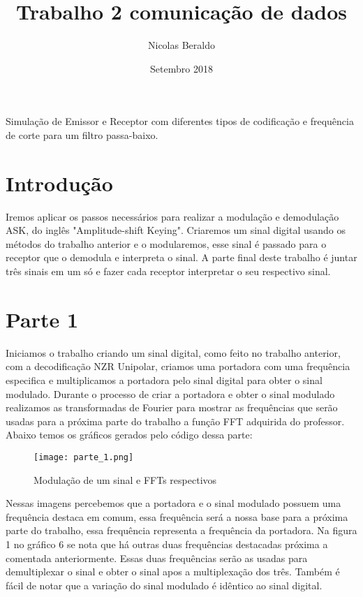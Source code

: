 \documentclass{article}
\title{Trabalho 2 comunicação de dados}
\author{Nicolas Beraldo}
\date{Setembro 2018}
\begin{document}
    \maketitle
        \begin{center}
            Simulação de Emissor e Receptor com diferentes tipos de codificação e frequência de corte para um filtro passa-baixo.
        \end{center}
    \section*{Introdução}
        Iremos aplicar os passos necessários para realizar a modulação e demodulação ASK, do inglês "Amplitude-shift Keying". Criaremos um sinal digital usando os métodos do trabalho anterior e o modularemos, esse sinal é passado para o receptor que o demodula e interpreta o sinal. A parte final deste trabalho é juntar três sinais em um só e fazer cada receptor interpretar o seu respectivo sinal.
    \section{Parte 1}
        Iniciamos o trabalho criando um sinal digital, como feito no trabalho anterior, com a decodificação NZR Unipolar, criamos uma portadora com uma frequência especifica e multiplicamos a portadora pelo sinal digital para obter o sinal modulado. Durante o processo de criar a portadora e obter o sinal modulado realizamos as transformadas de Fourier para mostrar as frequências que serão usadas para a próxima parte do trabalho a função FFT adquirida do professor. Abaixo temos os gráficos gerados pelo código dessa parte: 
        \begin{figure}[H]
            \begin{center}
                \texttt{[image: parte\_1.png]}
                \caption{Modulação de um sinal e FFTs respectivos}
                \label{fig:modulacao e FFT}
            \end{center}
        \end{figure}
        Nessas imagens percebemos que a portadora e o sinal modulado possuem uma frequência destaca em comum, essa frequência será a nossa base para a próxima parte do trabalho, essa frequência representa a frequência da portadora. Na figura 1 no gráfico 6 se nota que há outras duas frequências destacadas próxima a comentada anteriormente. Essas duas frequências serão as usadas para demultiplexar o sinal e obter o sinal apos a multiplexação dos três. Também é fácil de notar que a variação do sinal modulado é idêntico ao sinal digital.
        
\end{document}
